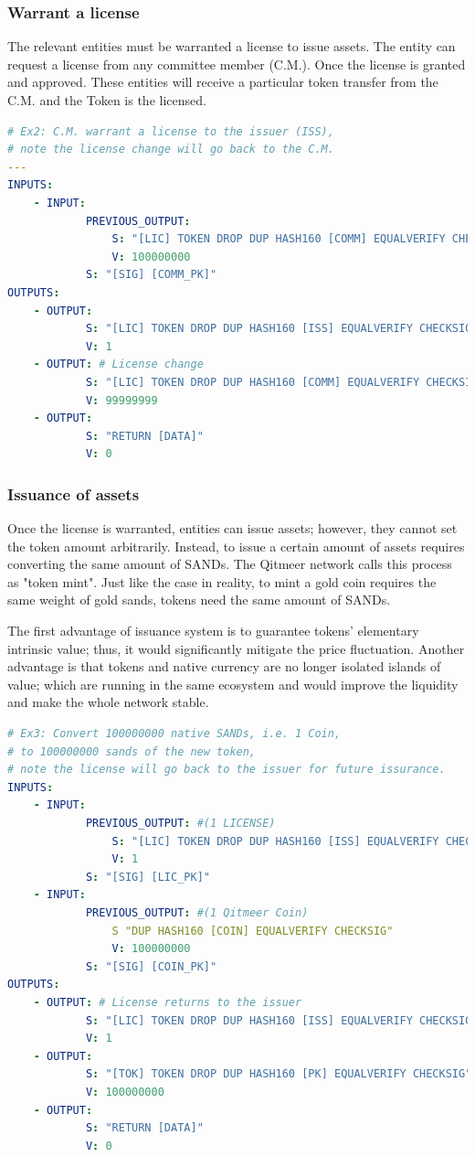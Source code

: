 \documentclass[a4paper,11pt]{article}
\begin{document}
\subsubsection{Warrant a license}

The relevant entities must be warranted a license to issue assets. The entity can request a license from any committee member (C.M.). Once the license is granted and approved. These entities will receive a particular token transfer from the C.M. and the Token is the licensed.

\lstset{basicstyle=\tiny,style=myListStyle}
\begin{lstlisting}[language=yaml, numbers=none,basicstyle=\footnotesize]
# Ex2: C.M. warrant a license to the issuer (ISS),
# note the license change will go back to the C.M.
---
INPUTS:
	- INPUT:
			PREVIOUS_OUTPUT:
				S: "[LIC] TOKEN DROP DUP HASH160 [COMM] EQUALVERIFY CHECKSIG"
				V: 100000000
			S: "[SIG] [COMM_PK]"
OUTPUTS:
	- OUTPUT:
			S: "[LIC] TOKEN DROP DUP HASH160 [ISS] EQUALVERIFY CHECKSIG"
			V: 1
	- OUTPUT: # License change
			S: "[LIC] TOKEN DROP DUP HASH160 [COMM] EQUALVERIFY CHECKSIG"
			V: 99999999
	- OUTPUT:
			S: "RETURN [DATA]"
			V: 0
\end{lstlisting}

\subsubsection{Issuance of assets}
Once the license is warranted, entities can issue assets; however, they cannot set the token amount arbitrarily. Instead, to issue a certain amount of assets requires converting the same amount of SANDs. The Qitmeer network calls this process as "token mint". Just like the case in reality, to mint a gold coin requires the same weight of gold sands, tokens need the same amount of SANDs.

The first advantage of issuance system is to guarantee tokens’ elementary intrinsic value; thus, it would significantly mitigate the price fluctuation. Another advantage is that tokens and native currency are no longer isolated islands of value; which are running in the same ecosystem and would improve the liquidity and make the whole network stable.

\lstset{basicstyle=\tiny,style=myListStyle}
\begin{lstlisting}[language=yaml, numbers=none,basicstyle=\footnotesize]
# Ex3: Convert 100000000 native SANDs, i.e. 1 Coin,
# to 100000000 sands of the new token,
# note the license will go back to the issuer for future issurance.
INPUTS:
	- INPUT:
			PREVIOUS_OUTPUT: #(1 LICENSE)
				S: "[LIC] TOKEN DROP DUP HASH160 [ISS] EQUALVERIFY CHECKSIG"
				V: 1
			S: "[SIG] [LIC_PK]"
	- INPUT:
			PREVIOUS_OUTPUT: #(1 Qitmeer Coin)
				S "DUP HASH160 [COIN] EQUALVERIFY CHECKSIG"
				V: 100000000
			S: "[SIG] [COIN_PK]"
OUTPUTS:
	- OUTPUT: # License returns to the issuer
			S: "[LIC] TOKEN DROP DUP HASH160 [ISS] EQUALVERIFY CHECKSIG"
			V: 1
	- OUTPUT:
			S: "[TOK] TOKEN DROP DUP HASH160 [PK] EQUALVERIFY CHECKSIG"
			V: 100000000
	- OUTPUT:
			S: "RETURN [DATA]"
			V: 0
\end{lstlisting}
\end{document}
